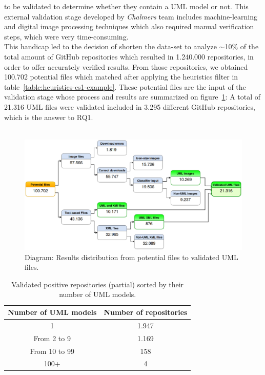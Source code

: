\documentclass[a4paper, 12pt]{book}
\begin{document}
to be validated to determine whether they contain a UML model or not. This external validation stage developed by \emph{Chalmers} team
includes machine-learning and digital image processing techniques which also required manual verification steps, which were very time-consuming.\\
This handicap led to the decision of shorten the data-set to analyze $\sim$10\% of the total amount of GitHub repositories which resulted
in 1.240.000 repositories, in order to offer accurately verified results. From those repositories, we obtained 100.702 potential files
which matched after applying the heuristics filter in table~\ref{table:heuristics-cs1-example}. These potential files are the input
of the validation stage whose process and results are summarized on figure~\ref{fig:validated-files-distribution}: A total of 21.316 UML
files were validated included in 3.295 different GitHub repositories, which is the answer to RQ1.\\\\
\begin{figure}
  \centering
  \includegraphics[width=16cm, keepaspectratio]{img/file-results-models-diagram}
  \caption{Diagram: Results distribution from potential files to validated UML files.}
  \label{fig:validated-files-distribution}
\end{figure}
\begin{table}[]
  \centering
  \caption{Validated positive repositories (partial) sorted by their number of UML models.}
  \label{table:validated-repos-table}
  \begin{tabular}{|c|c|}
  \hline
  \textbf{Number of UML models} & \textbf{Number of repositories}     \\ \hline
  1                             & 1.947                               \\
  From 2 to 9                   & 1.169                               \\
  From 10 to 99                 & 158                                 \\
  100+                          & 4                                   \\ \hline
  \end{tabular}
\end{table}
\end{document}
